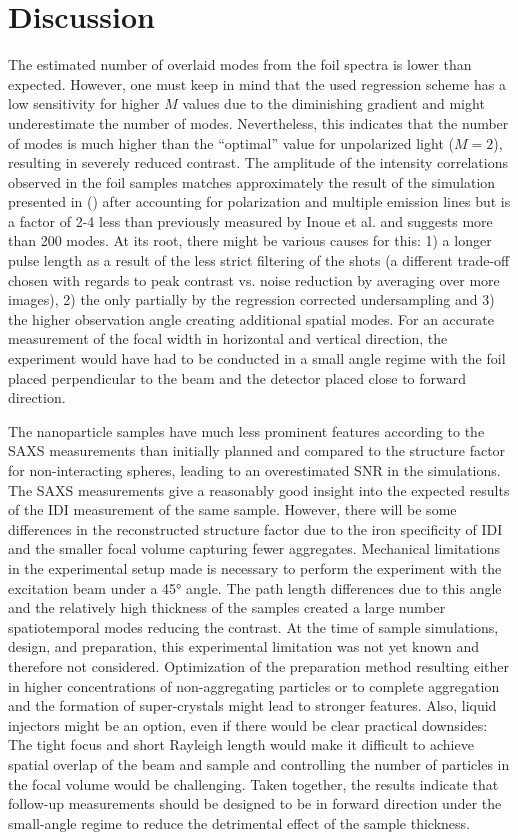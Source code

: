 \section{Discussion}

The estimated number of overlaid modes from the foil spectra is lower than expected. However, one must keep in mind that the used regression scheme has a low sensitivity for higher $M$ values due to the diminishing gradient and might underestimate the number of modes. Nevertheless, this indicates that the number of modes is much higher than the \enquote{optimal} value for unpolarized light ($M=2$), resulting in severely reduced contrast. The amplitude of the intensity correlations observed in the foil samples matches approximately the result of the simulation presented in   () after accounting for polarization and multiple emission lines but is a factor of 2-4 less than previously measured by Inoue et al. and suggests more than 200 modes. At its root, there might be various causes for this: 1) a longer pulse length as a result of the less strict filtering of the shots (a different trade-off chosen with regards to peak contrast vs. noise reduction by averaging over more images), 2) the only partially by the regression corrected undersampling and 3) the higher observation angle creating additional spatial modes. For an accurate measurement of the focal width in horizontal and vertical direction, the experiment would have had to be conducted in a small angle regime with the foil placed perpendicular to the beam and the detector placed close to forward direction.

The nanoparticle samples have much less prominent features according to the SAXS measurements than initially planned and compared to the structure factor for non-interacting spheres, leading to an overestimated SNR in the simulations. The SAXS measurements give a reasonably good insight into the expected results of the IDI measurement of the same sample. However, there will be some differences in the reconstructed structure factor due to the iron specificity of IDI and the smaller focal volume capturing fewer aggregates. Mechanical limitations in the experimental setup made is necessary to perform the experiment with the excitation beam under a 45° angle. The path length differences due to this angle and the relatively high thickness of the samples created a large number spatiotemporal modes reducing the contrast. At the time of sample simulations, design, and preparation, this experimental limitation was not yet known and therefore not considered.
Optimization of the preparation method resulting either in higher concentrations of non-aggregating particles or to complete aggregation and the formation of super-crystals might lead to stronger features. Also, liquid injectors might be an option, even if there would be clear practical downsides: The tight focus and short Rayleigh length would make it difficult to achieve spatial overlap of the beam and sample and controlling the number of particles in the focal volume would be challenging. Taken together, the results indicate that follow-up measurements should be designed to be in forward direction under the small-angle regime to reduce the detrimental effect of the sample thickness.

